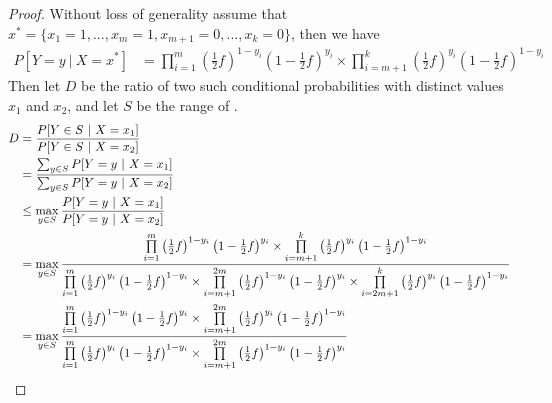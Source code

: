 \documentclass{article}
\begin{document}
\begin{enumerate}
\begin{proof}
	Without loss of generality assume that $x^*=\{x_1=1,...,x_m=1,x_{m+1}=0,...,x_k=0\}$, then we have
	\begin{align*}
		P[Y=y~|~X=x^*] &=%
			\prod\limits_{i=1}^m \left(\frac{1}{2}f\right)^{1-y_i}\left(1-\frac{1}{2}f\right)^{y_i}%
			\times \prod\limits_{i=m+1}^k\left(\frac{1}{2}f\right)^{y_i} \left(1-\frac{1}{2}f\right)^{1-y_i}
	\end{align*}
	Then let $D$ be the ratio of two such conditional probabilities with distinct values $x_1$ and $x_2$, and let $S$ be the range of .
	\begin{align}
		D &= \frac{P[Y\in S~|~X=x_1]}{P[Y\in S~|~X=x_2]}\\
			&= \frac{\sum_{y\in S}P[Y=y~|~X=x_1]}{\sum_{y\in S}P[Y=y~|~X=x_2]}\nonumber\\
			&\leq \max_{y\in S}\frac{P[Y=y~|~X=x_1]}{P[Y=y~|~X=x_2]}\nonumber\\
			&=\max_{y\in S}\frac{%
				\prod\limits_{i=1}^m \left(\frac{1}{2}f\right)^{1-y_i}\left(1-\frac{1}{2}f\right)^{y_i}%
				\times \prod\limits_{i=m+1}^k\left(\frac{1}{2}f\right)^{y_i} \left(1-\frac{1}{2}f\right)^{1-y_i}
			}{%
				\prod\limits_{i=1}^m \left(\frac{1}{2}f\right)^{y_i}\left(1-\frac{1}{2}f\right)^{1-y_i}%
				\times \prod\limits_{i=m+1}^{2m}\left(\frac{1}{2}f\right)^{1-y_i} \left(1-\frac{1}{2}f\right)^{y_i}\times%
				\prod\limits_{i=2m+1}^{k}\left(\frac{1}{2}f\right)^{y_i}\left(1-\frac{1}{2}f\right)^{1-y_i}
			}\nonumber\\
			&=\max_{y\in S}\frac{%
				\prod\limits_{i=1}^m \left(\frac{1}{2}f\right)^{1-y_i}\left(1-\frac{1}{2}f\right)^{y_i}%
				\times \prod\limits_{i=m+1}^{2m}\left(\frac{1}{2}f\right)^{y_i} \left(1-\frac{1}{2}f\right)^{1-y_i}%
			}{%
				\prod\limits_{i=1}^m \left(\frac{1}{2}f\right)^{y_i}\left(1-\frac{1}{2}f\right)^{1-y_i}%
				\times \prod\limits_{i=m+1}^{2m}\left(\frac{1}{2}f\right)^{1-y_i} \left(1-\frac{1}{2}f\right)^{y_i}%
}
\end{align}
\end{proof}
\end{enumerate}
\end{document}
